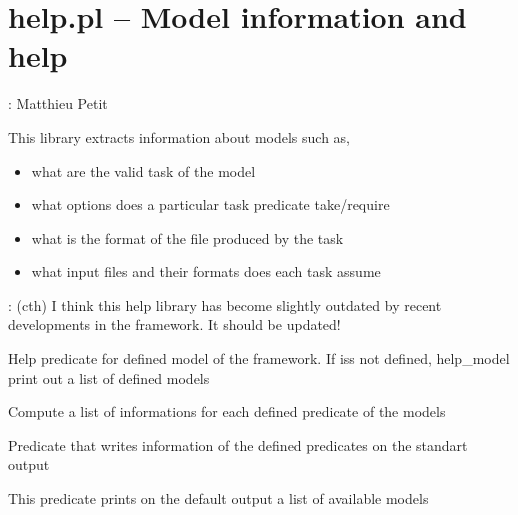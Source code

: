 


\section{help.pl -- Model information and help}

\label{sec:help}

\begin{tags}
: Matthieu Petit

This library extracts information about models such as,

\begin{itemize}
    \item what are the valid task of the model
    \item what options does a particular task predicate take/require
    \item what is the format of the file produced by the task
    \item what input files and their formats does each task assume
\end{itemize}

: (cth) I think this help library has become slightly outdated by recent developments in the framework. It should be updated!
\end{tags}

\vspace{0.7cm}

\begin{description}
Help predicate for defined model of the framework. If  iss not defined, help_model
print out a list of defined models

Compute a list of informations for each defined predicate of the models

Predicate that writes information of the defined predicates on the standart output

This predicate prints on the default output a list of available models
\end{description}

